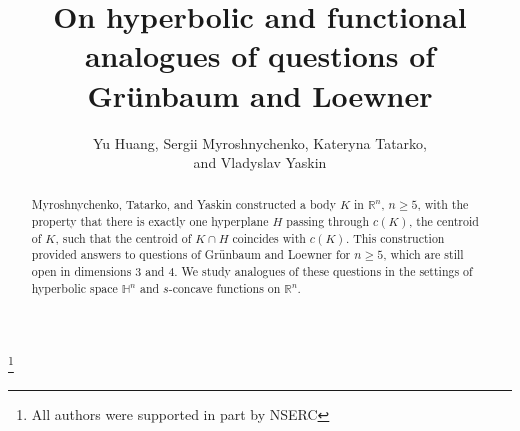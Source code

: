 \documentclass[12pt,letterpaper,reqno]{amsart}
\theoremstyle{definition}
\begin{document}
	\author{}	
	
	
			\address{Y.~Huang, Department of Mathematical and Statistical Sciences, University of Alberta, Edmonton, AB T6G 2N8, Canada}
	
	
	

	\address{S.~Myroshnychenko, Department of Mathematics and Statistics, University of the Fraser Valley, Abbotsford, BC V2S 7M8, Canada}
	
	
	
	\address{K.~Tatarko, Department of Pure Mathematics, University of Waterloo, Waterloo, ON N2L 3G1, Canada}
	
	
	
	\address{V.~Yaskin, Department of Mathematical and Statistical Sciences, University of Alberta, Edmonton, AB T6G 2N8, Canada}
	
	

	
	
	\thanks{All authors were supported in part by NSERC}
	
	
	
	
\title[Analogues of questions of Gr\"unbaum and Loewner]{On hyperbolic and functional analogues of questions of Gr\"unbaum and Loewner}

\author[Y. Huang, S. Myroshnychenko, K. Tatarko, and V. Yaskin]{Yu Huang, Sergii Myroshnychenko, Kateryna Tatarko,\\ and Vladyslav Yaskin}


\begin{abstract} 
Myroshnychenko, Tatarko, and Yaskin constructed a body $K$  in $\mathbb{R}^n$, $n \geq 5$, with the property that there is exactly one hyperplane $H$ passing through $c(K)$, the centroid of $K$, such that the centroid of $K\cap H$ coincides with $c(K)$.
This construction provided answers to  questions of Gr\"unbaum and Loewner for $n\geq 5$, which are still open in dimensions $3$ and $4$. We study analogues of these questions in the settings of  hyperbolic space $\mathbb H^n$ and   $s$-concave functions  on $\mathbb R^n$.
\end{abstract}

\maketitle
\end{document}

